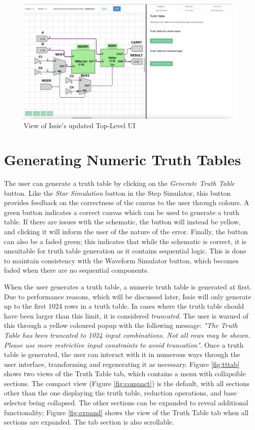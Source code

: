 \begin{figure}[h]
    \centering
    \includegraphics[width=\textwidth]{04.AnalysisDesign/Issieview.png}
    \caption{View of Issie's updated Top-Level UI}
    \label{fig:issieview}
\end{figure}

\section{Generating Numeric Truth Tables}
The user can generate a truth table by clicking on the \textit{Generate Truth Table} button. Like the  \textit{Star Simulation} button in the Step Simulator, this button provides feedback on the correctness of the canvas to the user through colours. A green button indicates a correct canvas which can be used to generate a truth table. If there are issues with the schematic, the button will instead be yellow, and clicking it will inform the user of the nature of the error. Finally, the button can also be a faded green; this indicates that while the schematic is correct, it is unsuitable for truth table generation as it contains sequential logic. This is done to maintain consistency with the Waveform Simulator button, which becomes faded when there are no sequential components.

When the user generates a truth table, a numeric truth table is generated at first. Due to performance reasons, which will be discussed later, Issie will only generate up to the first 1024 rows in a truth table. In cases where the truth table should have been larger than this limit, it is considered \textit{truncated}. The user is warned of this through a yellow coloured popup with the following message: \textit{"The Truth Table has been truncated to 1024 input combinations. Not all rows may be shown. Please use more restrictive input constraints to avoid truncation"}. Once a truth table is generated, the user can interact with it in numerous ways through the user interface, transforming and regenerating it as necessary. Figure \ref{fig:tttab} shows two views of the Truth Table tab, which contains a menu with collapsible sections. The compact view (Figure \ref{fig:compact}) is the default, with all sections other than the one displaying the truth table, reduction operations, and base selector being collapsed. The other sections can be expanded to reveal additional functionality; Figure \ref{fig:expand} shows the view of the Truth Table tab when all sections are expanded. The tab section is also scrollable.

